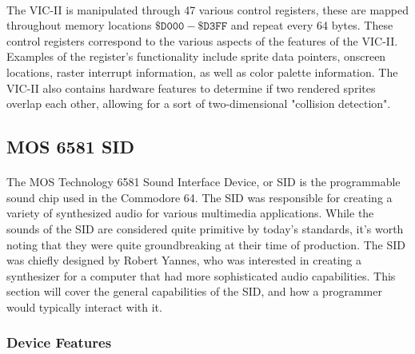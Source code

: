 \documentclass{article}
\begin{document}
\paragraph{}
The VIC-II is manipulated through 47 various control registers, these are mapped throughout memory locations $\mathtt{\$D000 - \$D3FF}$ and repeat every 64 bytes. These control registers correspond to the various aspects of the features of the VIC-II. Examples of the register's functionality include sprite data pointers, onscreen locations, raster interrupt information, as well as color palette information. The VIC-II also contains hardware features to determine if two rendered sprites overlap each other, allowing for a sort of two-dimensional "collision detection".

\subsection{MOS 6581 SID}
\paragraph{}
The MOS Technology 6581 Sound Interface Device, or SID is the programmable sound chip used in the Commodore 64. The SID was responsible for creating a variety of synthesized audio for various multimedia applications. While the sounds of the SID are considered quite primitive by today's standards, it's worth noting that they were quite groundbreaking at their time of production. The SID was chiefly designed by Robert Yannes, who was interested in creating a synthesizer for a computer that had more sophisticated audio capabilities. This section will cover the general capabilities of the SID, and how a programmer would typically interact with it.

\subsubsection{Device Features}
\end{document}
